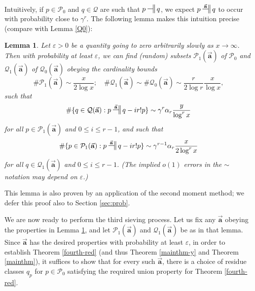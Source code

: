 \documentclass[11pt]{amsart}
\numberwithin{equation}{section}  %
\theoremstyle{remark}
\theoremstyle{plain}
\newtheorem{lem}{Lemma}[section]
\numberwithin{equation}{section}
\newcommand{\eps}{\ensuremath{\varepsilon}}
\renewcommand{\leq}{\leqslant}
\renewcommand{\(}{\left(}
\renewcommand{\)}{\right)}
\newcommand{\asym}{\sim}   %
\newcommand{\relr}{\nsdtstile{}{}} %
\newcommand{\relra}{\nsdtstile{}{\vect{\mathbf{a}}}} %
\newcommand{\vect}[1]{{\ensuremath{\vec{#1}}}}
\newcommand{\PP}{\mathcal{P}}
\newcommand{\QQ}{\mathcal{Q}}
\begin{document}
Intuitively, if $p \in \PP_0$ and $q \in \QQ$ are such that $p \relr q$, we expect $p \relra q$ to occur with probability close to $\gamma^r$.  The following lemma makes this intuition precise (compare with Lemma \ref{Q0}):


\begin{lem}\label{sieveunited} 
Let $\eps > 0$ be a quantity going to zero arbitrarily slowly as $x \to \infty$.
Then with probability at least $\eps$, we can find (random) subsets
$\PP_1(\vect{\mathbf{a}})$  of $\PP_0$ and $\QQ_1(\vect{\mathbf{a}})$
of $\QQ_0(\vect{\mathbf{a}})$ obeying the cardinality
bounds
\begin{equation}\label{ppqq1}
\# \PP_1(\vect{\mathbf{a}}) \asym \frac{x}{2\log x}; \quad \# \QQ_1(\vect{\mathbf{a}}) \asym \# \QQ_0(\vect{\mathbf{a}}) \asym \frac{r}{2\log r} \frac{x}{\log x},
\end{equation}
such that
$$ \# \{ q \in \QQ(\vect{\mathbf{a}}): p \relra q - ir! p \} \asym \gamma^r\alpha_r\frac y{\log^r x}$$
for \emph{all} $p \in \PP_1(\vect{\mathbf{a}})$ and $0 \leq i \leq r-1$, and such that
$$ \# \{ p \in \PP_1(\vect{\mathbf{a}}):  p \relra q - ir! p \} \asym \gamma^{r-1} \alpha_r \frac{x}{2\log^r x} $$
for \emph{all} $q \in \QQ_1(\vect{\mathbf{a}})$ and $0 \leq i \leq
r-1$.  (The implied $o(1)$ errors in the $\asym$ notation may depend on $\eps$.)
\end{lem}

This lemma is also proven by an application of the second moment method; we defer this proof also to Section \ref{sec:prob}.

We are now ready to perform the third sieving process.
 Let us fix any $\vect{\mathbf{a}}$ obeying the
properties in Lemma \ref{sieveunited}, and let
$\PP_1(\vect{\mathbf{a}})$ and $\QQ_1(\vect{\mathbf{a}})$ be as in
that lemma.  Since $\vect{\mathbf{a}}$ has the desired properties 
with probability at least $\eps$, in order to establish
Theorem \ref{fourth-red} (and thus Theorem \ref{mainthm-y} and Theorem
\ref{mainthm}), it suffices to show that for every such
 $\vect{\mathbf{a}}$, there is a choice of residue classes $q_p$ for 
$p\in \PP_0$ satisfying the required union property for Theorem
\ref{fourth-red}.
\end{document}
